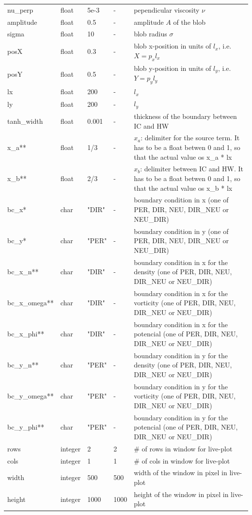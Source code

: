 \documentclass{hitec} %
\begin{document}
\begin{longtable}{llll>{\RaggedRight}p{7cm}}
nu\_perp     & float & 5e-3   & - & pependicular viscosity $\nu$ \\
amplitude  & float & 0.5    & - & amplitude $A$ of the blob \\
sigma      & float & 10     & - & blob radius $\sigma$ \\
posX       & float & 0.3    & - & blob x-position in units of $l_x$, i.e. $X = p_x l_x$\\
posY       & float & 0.5    & - & blob y-position in units of $l_y$, i.e. $Y = p_y l_y$ \\
lx         & float & 200    & - & $l_x$  \\
ly         & float & 200    & - & $l_y$  \\
tanh\_width & float & 0.001 & - & thickness of the boundary between IC and HW \\
x\_a**      & float & 1/3   & - & $x_a$: delimiter for the source term. It has to be a float betwen 0 and 1, so that the actual value os x_a * lx \\
x\_b**      & float & 2/3   & - & $x_b$: delimiter between IC and HW. It has to be a float betwen 0 and 1, so that the actual value os x_b * lx   \\
bc\_x*   & char & "DIR"      & - & boundary condition in x (one of PER, DIR, NEU, DIR\_NEU or NEU\_DIR) \\
bc\_y*   & char & "PER"      & - & boundary condition in y (one of PER, DIR, NEU, DIR\_NEU or NEU\_DIR) \\
bc\_x\_n**   & char & "DIR"      & - & boundary condition in x for the density (one of PER, DIR, NEU, DIR\_NEU or NEU\_DIR) \\
bc\_x\_omega**   & char & "DIR"      & - & boundary condition in x for the vorticity (one of PER, DIR, NEU, DIR\_NEU or NEU\_DIR) \\
bc\_x\_phi**   & char & "DIR"      & - & boundary condition in x for the potencial (one of PER, DIR, NEU, DIR\_NEU or NEU\_DIR) \\
bc\_y\_n**   & char & "PER"      & - & boundary condition in y for the density (one of PER, DIR, NEU, DIR\_NEU or NEU\_DIR) \\
bc\_y\_omega**   & char & "PER"      & - & boundary condition in y for the vorticity (one of PER, DIR, NEU, DIR\_NEU or NEU\_DIR) \\
bc\_y\_phi**   & char & "PER"      & - & boundary condition in y for the potencial (one of PER, DIR, NEU, DIR\_NEU or NEU\_DIR) \\

rows   & integer &  2 & 2 & \# of rows in window for live-plot \\
cols   & integer &  1 & 1 & \# of cols in window for live-plot \\
width  & integer & 500& 500 & width of the window in pixel in live-plot \\
height  & integer & 1000& 1000 & height of the window in pixel in live-plot \\
\bottomrule
\end{longtable}
\end{document}
